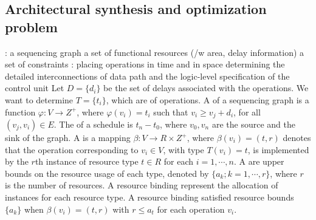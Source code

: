 \documentclass{note}
\begin{document}
\subsection{Architectural synthesis and optimization problem}
\bit
\w {}: 
   \bit
   \w a sequencing graph
   \w a set of functional resources (/w area, delay information)
   \w a set of constraints
   \eit
\w {}:
   \bit
   \w [(1)] placing operations in time and in space
   \w [(2)] determining the detailed interconnections of data path and the
   logic-level specification of the control unit
   \eit
\w {}
  \bit
  \w Let $D = \{d_i\}$ be the set of delays associated with the operations.
  \w We want to determine $T = \{t_i\}$, which are  of
  operations.
  \w A  of a sequencing graph is a function $\varphi: V
  \rightarrow Z^+$, where $\varphi(v_i) = t_i$ such that
  $v_i \ge v_j + d_i$, for all $(v_j, v_i) \in E$.
  \w The  of a schedule is $t_n - t_0$, where $v_0, v_n$ are
   the source and the sink of the graph.
  \eit
\w {}
  \bit
  \w A  is a mapping $\beta: V \rightarrow R \times Z^+$,
  where $\beta(v_i) = (t, r)$ denotes that the operation corresponding to $v_i
  \in V$, with type $T(v_i) = t$, is implemented by the $r$th instance of
  resource type $t \in R$ for each $i = 1, \cdots, n$. 
  \w A  are upper bounds on the resource usage of each
  type, denoted by $\{a_k; k =1, \cdots, r\}$, where $r$ is the number of
  resources. 
  A resource binding represent the allocation of instances for each resource
  type. A resource binding satisfied resource bounds $\{a_k\}$ when
  $\beta(v_i) = (t, r)$ with $r \le a_t$ for each operation $v_i$. 
  \eit
\eit
\end{document}
